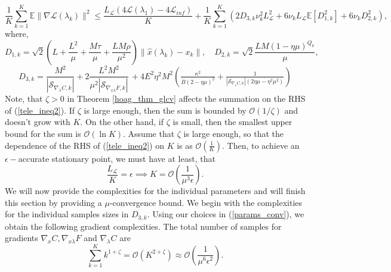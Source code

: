 \documentclass[11pt, twoside]{report}
\begin{document}
\begin{equation} \label{tele_ineq2}
    \frac{1}{K}\sum_{k=1}^K \mathbb{E}\|\nabla\mathcal{L}(\lambda_k)\|^2 \leq  \frac{L_\mathcal{L}\left(4\mathcal{L}(\lambda_1) - 4\mathcal{L}_{inf}\right)}{K} + \frac{1}{K}\sum_{k=1}^K \left(2D_{3,k}\nu_k^2 L^2_{\mathcal{L}} + 6\nu_kL_\mathcal{L}\mathbb{E}[D_{1,k}^2] + 6\nu_k D_{2,k}^2\right),
\end{equation}
where,
\[D_{1,k} = \sqrt{2}\left(L + \frac{L^2}{\mu} + \frac{M\tau}{\mu} + \frac{LM\rho}{\mu^2} \right) \|\hat{x}(\lambda_k) - x_k\|, \quad D_{2,k} = \sqrt{2} \frac{LM(1-\eta \mu)^{Q_k}}{\mu},\]
\begin{equation} \label{varbndthm2}
    D_{3,k} = \frac{M^2}{|\mathcal{S}_{\nabla_\lambda C,k}|} 
+ 2 \frac{L^2 M^2}{\mu^2|\mathcal{S}_{\nabla_{x\lambda} F,k}|} \, 
+ 4E^2\eta^2 M^2 \left( \tfrac{\kappa^2}{B (2 - \eta \mu)^2} 
+ \tfrac{1}{|\mathcal{S}_{\nabla_x C,k}|(2\eta \mu - \eta^2 \mu^2)} \right)
\end{equation}
Note, that $\zeta>0$ in Theorem \ref{hoag_thm_glcv} affects the summation on the RHS of (\ref{tele_ineq2}). If $\zeta$ is large enough, then the sum is bounded by $\mathcal{O}(1/\zeta)$ and doesn't grow with $K$. On the other hand, if $\zeta$ is small, then the smallest upper bound for the sum is $\mathcal{O}(\ln{K})$. Assume that $\zeta$ is large enough, so that the dependence of the RHS of (\ref{tele_ineq2}) on $K$ is as $\mathcal{O}\left( \frac{1}{K} \right)$. Then, to achieve an $\epsilon-$accurate stationary point, we must have at least, that
\[\frac{L_\mathcal{L}}{K} = \epsilon \implies K = \mathcal{O}\left(\frac{1}{\mu^3 \epsilon} \right).\]
We will now provide the complexities for the individual parameters and will finish this section by providing a $\mu$-convergence bound. We begin with the complexities for the individual samples sizes in $D_{3,k}$. Using our choices in (\ref{params_conv}), we obtain the following gradient complexities. The total number of samples for gradients $\nabla_{x}C, \nabla_{x\lambda} F$ and $\nabla_\lambda C$ are
\[\sum_{k=1}^K k^{1+\zeta} = \mathcal{O} \left(K^{2+\zeta} \right) \approx \mathcal{O}\left(\frac{1}{\mu^6\epsilon^2}\right).\]
\end{document}
